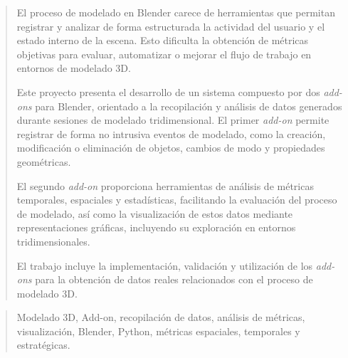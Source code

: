 \documentclass[a4paper,12pt,twoside]{memoir}
\begin{document}





\newpage\null\thispagestyle{empty}\newpage




\frontmatter

\renewcommand*\abstractname{Resumen}
\begin{abstract}

El proceso de modelado en Blender carece de herramientas que permitan registrar y analizar de forma estructurada la actividad del usuario y el estado interno de la escena. Esto dificulta la obtención de métricas objetivas para evaluar, automatizar o mejorar el flujo de trabajo en entornos de modelado 3D.


Este proyecto presenta el desarrollo de un sistema compuesto por dos \textit{add-ons} para Blender, orientado a la recopilación y análisis de datos generados durante sesiones de modelado tridimensional. El primer \textit{add-on} permite registrar de forma no intrusiva eventos de modelado, como la creación, modificación o eliminación de objetos, cambios de modo y propiedades geométricas.


El segundo \textit{add-on} proporciona herramientas de análisis de métricas temporales, espaciales y estadísticas, facilitando la evaluación del proceso de modelado, así como la visualización de estos datos mediante representaciones gráficas, incluyendo su exploración en entornos tridimensionales.


El trabajo incluye la implementación, validación y utilización de los \textit{add-ons} para la obtención de datos reales relacionados con el proceso de modelado 3D.

\end{abstract}

\renewcommand*\abstractname{Descriptores}
\begin{abstract}

Modelado 3D, Add-on, recopilación de datos, análisis de métricas, visualización, Blender, Python, métricas espaciales, temporales y estratégicas.


\end{abstract}

\clearpage
\end{document}
